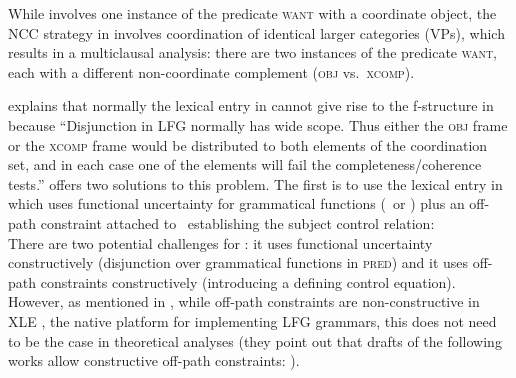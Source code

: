 \documentclass[output=paper]{../langscibook}
\begin{document}
\noindent
While
 involves one instance of the
predicate \textsc{want} with a coordinate object, the NCC strategy in
 involves
coordination of identical larger categories (VPs), which results in
a multiclausal analysis: there are two instances of the predicate \textsc{want},
each with a different non-coordinate complement (\textsc{obj} vs.\ \textsc{xcomp}).

\citet[138]{kapl:17} explains that normally the lexical entry in
 cannot give rise to the f-structure in
 because
``Disjunction in LFG normally has wide scope. Thus either the
\textsc{obj} frame or the \textsc{xcomp} frame would be distributed to
both elements of the coordination set, and in each case one of the
elements will fail the completeness/coherence tests.''
\ea\label{ex:kapl:17:24}
\lexentry{want}{\phtm{$\vee$} (\UP\PRED)=\textsc{`want\arglist{\SUBJ,\OBJ}'}\\
  $\vee$ [(\UP\PRED)=\textsc{`want\arglist{\SUBJ,\XCOMP}}'\\
  \phtm{$\vee$[} (\UP\XCOMP\SUBJ)=(\UP\SUBJ)]}\hfill\citep[(24)]{kapl:17}
\z
\citet{kapl:17} offers two solutions to this problem. The first is
to use the lexical entry in  which uses
functional uncertainty for grammatical functions (\OBJ\ or
\XCOMP) plus an off-path constraint attached to \XCOMP\
establishing the subject control relation:
\ea\label{ex:kapl:17:28}
\\\hspace{\fill}\citep[(28)]{kapl:17}
\z
There are two potential challenges for : it uses
functional uncertainty constructively
(disjunction over grammatical functions in \textsc{pred}) and it uses off-path
constraints constructively (introducing a defining control equation).
However, as mentioned in \citet{PatejukPrzepiorkowski2014}, while off-path
constraints are non-constructive in XLE \citep{xledoc},
the native platform for implementing LFG grammars, this does not need
to be the case in theoretical analyses (they point out that drafts of the
following works allow constructive off-path constraints:
\citet{BresnanEtAl2016,DLM:LFG}).
\end{document}
